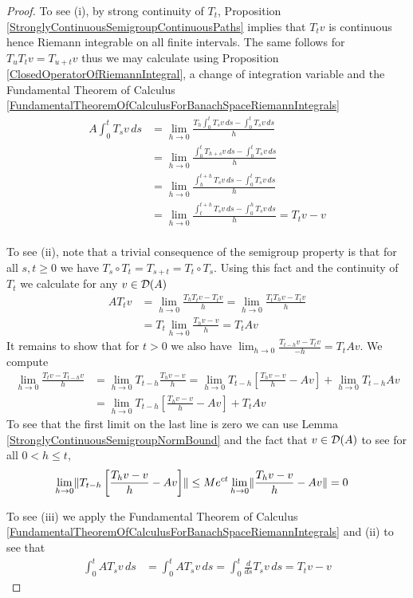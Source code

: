 \begin{proof}
To see (i), by strong continuity of $T_t$, Proposition \ref{StronglyContinuousSemigroupContinuousPaths} implies  that $T_tv$ is continuous hence Riemann integrable on all finite intervals.  The same follows for $T_u T_t v = T_{u+t}v$ thus we may calculate using Proposition \ref{ClosedOperatorOfRiemannIntegral}, a change of integration variable and the Fundamental Theorem of Calculus \ref{FundamentalTheoremOfCalculusForBanachSpaceRiemannIntegrals}
\begin{align*}
A \int_0^t T_sv \, ds &= \lim_{h \to 0}  \frac{T_h \int_0^t T_sv \, ds - \int_0^t T_sv \, ds}{h} \\
&= \lim_{h \to 0}  \frac{\int_0^t T_{h+s} v \, ds - \int_0^t T_sv \, ds}{h} \\
&= \lim_{h \to 0}  \frac{\int_h^{t+h} T_{s} v \, ds - \int_0^t T_sv \, ds}{h} \\
&= \lim_{h \to 0}  \frac{\int_t^{t+h} T_{s} v \, ds - \int_0^h T_sv \, ds}{h} = T_t v - v\\
\end{align*}

To see (ii), note that a trivial consequence of the semigroup property is that for all $s,t \geq 0$ we have $T_s \circ T_t = T_{s+t} = T_t \circ T_s$.  Using this fact and
the continuity of $T_t$ we calculate for any $v \in \mathcal{D}(A)$ 
\begin{align*}
A T_t v &= \lim_{h \to 0} \frac{T_h T_t v - T_t v}{h} =\lim_{h \to 0} \frac{T_t T_h v - T_t v}{h} \\
&= T_t \lim_{h \to 0} \frac{T_h v - v}{h} = T_t A v
\end{align*}
It remains to show that for $t > 0$ we also have $\lim_{h \to 0} \frac{T_{t-h} v - T_t v}{-h} = T_t A v$.  
We compute
\begin{align*}
\lim_{h \to 0} \frac{T_t v - T_{t-h} v}{h} &= \lim_{h \to 0} T_{t-h} \frac{T_h v - v}{h} 
= \lim_{h \to 0} T_{t-h} \left[\frac{T_h v - v}{h} -Av\right] + \lim_{h \to 0} T_{t-h} Av \\
&=\lim_{h \to 0} T_{t-h} \left[\frac{T_h v - v}{h} -Av\right] + T_t Av
\end{align*}
To see that the first limit on the last line is zero we can use Lemma \ref{StronglyContinuousSemigroupNormBound} and the fact that $v \in \mathcal{D}(A)$ to see for all $0 < h \leq t$,
\begin{align*}
\lim_{h \to 0} \lVert T_{t-h} \left[\frac{T_h v - v}{h} -Av\right] \rVert &\leq M e^{ct} \lim_{h \to 0} \lVert \frac{T_h v - v}{h} -Av \rVert = 0
\end{align*}

To see (iii) we apply the Fundamental Theorem of Calculus \ref{FundamentalTheoremOfCalculusForBanachSpaceRiemannIntegrals} and (ii) to see that
\begin{align*}
\int_0^t A T_s v \, ds &= \int_0^t A T_s v \, ds = \int_0^t \frac{d}{ds} T_s v \, ds = T_t v - v
\end{align*}
\end{proof}


